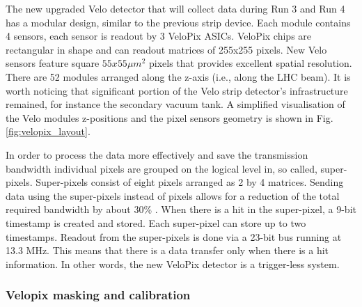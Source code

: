 The new upgraded Velo detector that will collect data during Run 3 and Run 4 has a modular design, similar to the previous strip device. Each module contains 4 sensors, each sensor is readout by
3 VeloPix ASICs. VeloPix chips are rectangular in shape and can readout matrices of 255x255 pixels.
New Velo sensors feature square $55 x 55 \mu m^{2}$ pixels that provides excellent spatial resolution. 
There are 52 modules arranged along the z-axis (i.e., along the LHC beam). It is worth noticing that significant portion of the Velo strip detector's infrastructure remained, for instance the secondary vacuum tank.
A simplified visualisation of the Velo modules z-positions and the pixel sensors geometry is shown in Fig. \ref{fig:velopix_layout}.

In order to process the data more effectively and save the transmission bandwidth individual pixels are grouped on the logical level in, so called, super-pixels.
Super-pixels consist of eight pixels arranged as 2 by 4 matrices.
Sending data using the super-pixels instead of pixels allows for a reduction of the total required bandwidth by about 30\% \cite{Collaboration:1624070}.
When there is a hit in the super-pixel, a 9-bit timestamp is created and stored.
Each super-pixel can store up to two timestamps.
Readout from the super-pixels is done via a 23-bit bus running at 13.3 MHz.
This means that there is a data transfer only when there is a hit information. In other words, the new VeloPix detector is a trigger-less system.

\subsubsection{Velopix masking and calibration}
\label{chap2:velopix_calibration}

